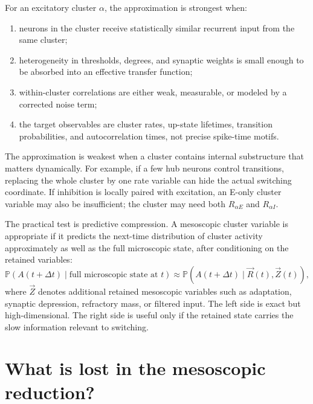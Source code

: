 For an excitatory cluster $\alpha$, the approximation is strongest when:
%
\begin{enumerate}[leftmargin=*]
  \item neurons in the cluster receive statistically similar recurrent input from the same cluster;
  \item heterogeneity in thresholds, degrees, and synaptic weights is small enough to be absorbed into an effective transfer function;
  \item within-cluster correlations are either weak, measurable, or modeled by a corrected noise term;
  \item the target observables are cluster rates, up-state lifetimes, transition probabilities, and autocorrelation times, not precise spike-time motifs.
\end{enumerate}
%
The approximation is weakest when a cluster contains internal substructure that matters dynamically. For example, if a few hub neurons control transitions, replacing the whole cluster by one rate variable can hide the actual switching coordinate. If inhibition is locally paired with excitation, an E-only cluster variable may also be insufficient; the cluster may need both $R_{\alpha E}$ and $R_{\alpha I}$.

The practical test is predictive compression. A mesoscopic cluster variable is appropriate if it predicts the next-time distribution of cluster activity approximately as well as the full microscopic state, after conditioning on the retained variables:
%
\begin{equation}
  \mathbb{P}\!\left(A(t+\Delta t)\mid \text{full microscopic state at }t\right)
  \approx
  \mathbb{P}\!\left(A(t+\Delta t)\mid \vec R(t),\vec Z(t)\right),
  \label{eq:predictive-compression}
\end{equation}
%
where $\vec Z$ denotes additional retained mesoscopic variables such as adaptation, synaptic depression, refractory mass, or filtered input. The left side is exact but high-dimensional. The right side is useful only if the retained state carries the slow information relevant to switching.

\section{What is lost in the mesoscopic reduction?}
\label{sec:what-is-lost-mesoscopic}

